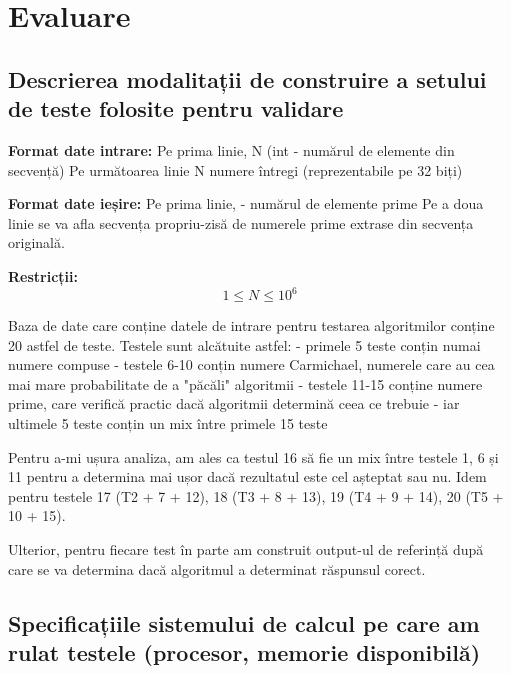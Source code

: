 \documentclass[runningheads]{llncs}
\begin{document}
\section{Evaluare}

\subsection{Descrierea modalitații de construire a setului de teste folosite pentru validare}

\quad \quad \textbf{Format date intrare:} \newline
Pe prima linie, N (int - numărul de elemente din secvență) \newline
Pe următoarea linie N numere întregi (reprezentabile pe 32 biți) \newline

\textbf{Format date ieșire:} \newline
Pe prima linie,  - numărul de elemente prime \newline
Pe a doua linie se va afla secvența propriu-zisă de numerele prime extrase din secvența originală. \newline

\textbf{Restricții:}
\begin{equation*}
    1 \leq N \leq 10^{6}
\end{equation*}

Baza de date care conține datele de intrare pentru testarea algoritmilor conține 20 astfel de teste. Testele sunt alcătuite
astfel: \newline
- primele 5 teste conțin numai numere compuse
- testele 6-10 conțin numere Carmichael, numerele care au cea mai mare probabilitate de a "păcăli" algoritmii
- testele 11-15 conține numere prime, care verifică practic dacă algoritmii determină ceea ce trebuie
- iar ultimele 5 teste conțin un mix între primele 15 teste

Pentru a-mi ușura analiza, am ales ca testul 16 să fie un mix între testele 1, 6 și 11 pentru a determina mai ușor dacă rezultatul este cel așteptat sau nu.
Idem pentru testele 17 (T2 + 7 + 12), 18 (T3 + 8 + 13), 19 (T4 + 9 + 14), 20 (T5 + 10 + 15).

Ulterior, pentru fiecare test în parte am construit output-ul de referință după care se va determina dacă algoritmul a determinat răspunsul corect.

\subsection{Specificațiile sistemului de calcul pe care am rulat testele (procesor, memorie disponibilă)}
\end{document}

